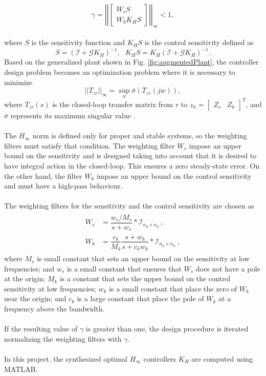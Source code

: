 	\begin{equation}\label{eqn:hinf}
	\gamma = \left|\left|\begin{bmatrix}
	W_{s}S\\W_{k}K_{H}S
	\end{bmatrix}\right|\right|_{\infty} < 1,
	\end{equation}
\\where $S$ is the sensitivity function and $K_{H}S$ is the control sensitivity defined as
	\begin{equation}
	S = (\mathcal{I} + \mathcal{G}K_{H})^{-1},\ \ \ K_{H}S = K_{H}(\mathcal{I} + \mathcal{G}K_{H})^{-1}.
	\end{equation}
	Based on the generalized plant shown in Fig. \ref{fig:augmentedPlant}, the controller design problem becomes an optimization problem where it is necessary to minimize
	\begin{equation}
	||T_{zr}||_{\infty} = \sup_{w} \bar{\sigma}(T_{zr}(jw)),
	\end{equation}
	where $T_{zr}(s)$ is the closed-loop transfer matrix from $r$ to $z_h = \begin{bmatrix}
Z_s & Z_k
\end{bmatrix}^{T}$, and $\bar{\sigma}$ represents its maximum singular value \cite{Araar2014}.
	\\\\
The $H_\infty$ norm is defined only for proper and stable systems, so the weighting filters must satisfy that condition. The weighting filter $W_{s}$ impose an upper bound on the sensitivity and is designed taking into account that it is desired to have integral action in the closed-loop. This ensures a zero steady-state error. On the other hand, the filter $W_k$ impose an upper bound on the control sensitivity and must have a high-pass behaviour.
\\\\
The weighting filters for the sensitivity and the control sensitivity are chosen as
\begin{align}\label{eqn:wswk}
\begin{split}
W_{s} &= \dfrac{w_{s}/M_{s}}{s + w_{s}}*\mathcal{I}_{n_{y}\times n_{y}}\ ,\\
W_{k} &= \dfrac{c_k}{M_{k}}\dfrac{s+w_{k}}{s+c_{k}w_{k}}*\mathcal{I}_{n_{u}\times n_{u}}\ ,
\end{split}
\end{align}
where $M_s$ is small constant that sets an upper bound on the sensitivity at low frequencies; and $w_s$ is a small constant that ensures that $W_s$ does not have a pole at the origin; $M_k$ is a constant that sets the upper bound on the control sensitivity at low frequencies; $w_k$ is a small constant that place the zero of $W_k$ near the origin; and $c_k$ is a large constant that place the pole of $W_k$ at a frequency above the bandwidth.
\\\\
If the resulting value of $\gamma$ is greater than one, the design procedure is iterated normalizing the weighting filters with $\gamma$.
\\\\
In this project, the synthesized optimal $H_\infty$ controllers $K_H$ are computed using MATLAB.

